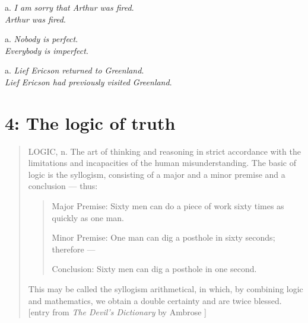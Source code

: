 \begin{stylepoints}
\ea%
    \label{ex:key:3}




          a. \textit{I am sorry that Arthur was fired}.\\
\ex \textit{Arthur was fired}.
    \z
\end{stylepoints}

\begin{stylepoints}
\ea%
    \label{ex:key:4}




          a. \textit{Nobody is perfect}.\\
\ex \textit{Everybody is imperfect}.
    \z
\end{stylepoints}

\begin{stylepoints}
\ea%
    \label{ex:key:5}




          a. \textit{Lief Ericson returned to Greenland}.\\
\ex \textit{Lief Ericson had previously visited Greenland}.
    \z
\end{stylepoints}

\chapter{{4}: The logic of truth}

\begin{quotation}LOGIC, n.  The art of thinking and reasoning in strict accordance with the limitations and incapacities of the human misunderstanding. The basic of logic is the syllogism, consisting of a major and a minor premise and a conclusion — thus:

\begin{quote}
Major Premise: Sixty men can do a piece of work sixty times as quickly as one man.

Minor Premise: One man can dig a posthole in sixty seconds; therefore —

Conclusion: Sixty men can dig a posthole in one second.
\end{quote}

This may be called the syllogism arithmetical, in which, by combining logic and mathematics, we obtain a double certainty and are twice blessed.\\
{}[entry from \textit{The Devil’s Dictionary} by Ambrose \citet{Bierce1911}]
\end{quotation}

